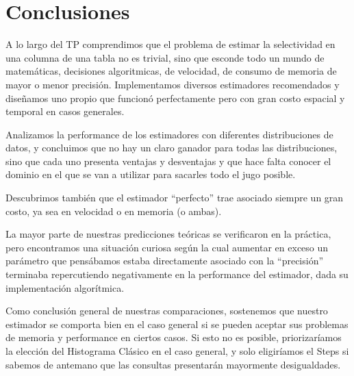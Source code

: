 \section{Conclusiones}
A lo largo del TP comprendimos que el problema de estimar la selectividad en una columna de una tabla no es trivial, sino que esconde todo un mundo de matemáticas, decisiones algoritmicas, de velocidad, de consumo de memoria de mayor o menor precisión. Implementamos diversos estimadores recomendados y diseñamos uno propio que funcionó perfectamente pero con gran costo espacial y temporal en casos generales.

Analizamos la performance de los estimadores con diferentes distribuciones de datos, y concluimos que no hay un claro ganador para todas las distribuciones, sino que cada uno presenta ventajas y desventajas y que hace falta conocer el dominio en el que se van a utilizar para sacarles todo el jugo posible.

Descubrimos también que el estimador ``perfecto'' trae asociado siempre un gran costo, ya sea en velocidad o en memoria (o ambas).

La mayor parte de nuestras predicciones teóricas se verificaron en la práctica, pero encontramos una situación curiosa según la cual aumentar en exceso un parámetro que pensábamos estaba directamente asociado con la ``precisión'' terminaba repercutiendo negativamente en la performance del estimador, dada su implementación algorítmica.

Como conclusión general de nuestras comparaciones, sostenemos que nuestro estimador se comporta bien en el caso general si se pueden aceptar sus problemas de memoria y performance en ciertos casos. Si esto no es posible, priorizaríamos la elección del Histograma Clásico en el caso general, y solo eligiríamos el Steps si sabemos de antemano que las consultas presentarán mayormente desigualdades.